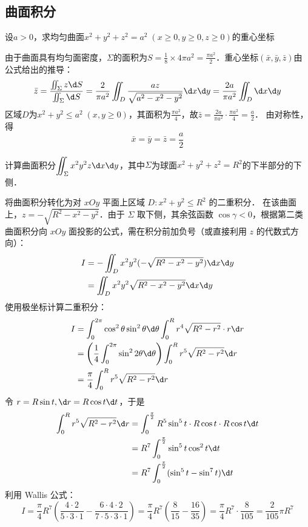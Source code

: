 \documentclass[12pt, a4paper, oneside, UTF8]{ctexbook}
\begin{document}
\subsection{曲面积分}
\begin{exercise}
    设$a>0$，求均匀曲面$x^2+y^2+z^2=a^2\;(x\ge 0,y\ge 0,z\ge 0)$的重心坐标
\end{exercise}
\begin{solution}
    由于曲面具有均匀面密度，$\Sigma$的面积为$S=\frac{1}{8}\times 4\pi a^2 = \frac{\pi a^2}{2}$．重心坐标$(\bar{x},\bar{y},\bar{z})$由公式给出的推导：
    \[\bar{z}=\frac{\iint_\Sigma z\d S}{\iint_\Sigma \d S}=\frac{2}{\pi a^2}\iint_D \frac{az}{\sqrt{a^2-x^2-y^2}}\d x\d y = \frac{2a}{\pi a^2}\iint_D \d x\d y\]
    区域$D$为$x^2+y^2 \le a^2\;(x,y\ge 0)$，其面积为$\frac{\pi a^2}{4}$，故$\bar{z} = \frac{2a}{\pi a^2} \cdot \frac{\pi a^2}{4} = \frac{a}{2}$．
    由对称性，得\[\boxed{\bar{x}=\bar{y}=\bar{z}=\frac{a}{2}}\]
\end{solution}
\begin{exercise}
    计算曲面积分$\displaystyle\iint_\Sigma x^2y^2z \d x\d y$，其中$\Sigma$为球面$x^2+y^2+z^2=R^2$的下半部分的下侧．
\end{exercise}
\begin{solution}
    将曲面积分转化为对 $xOy$ 平面上区域 $D: x^2+y^2 \le R^2$ 的二重积分．
    在该曲面上，$z = -\sqrt{R^2-x^2-y^2}$．由于 $\Sigma$ 取下侧，其余弦函数 $\cos\gamma < 0$，根据第二类曲面积分向 $xOy$ 面投影的公式，需在积分前加负号（或直接利用 $z$ 的代数式方向）：
    \begin{align*}
        I &= -\iint_D x^2 y^2 (-\sqrt{R^2-x^2-y^2}) \d x\d y \\
        &= \iint_D x^2 y^2 \sqrt{R^2-x^2-y^2} \d x\d y
    \end{align*}
    使用极坐标计算二重积分：
    \begin{align*}
        I &= \int_0^{2\pi} \cos^2\theta \sin^2\theta \d \theta \int_0^R r^4 \sqrt{R^2-r^2} \cdot r \d r \\
        &= \left( \frac{1}{4} \int_0^{2\pi} \sin^2 2\theta \d \theta \right) \int_0^R r^5 \sqrt{R^2-r^2} \d r \\
        &= \frac{\pi}{4} \int_0^R r^5 \sqrt{R^2-r^2} \d r
    \end{align*}
    令 $r = R\sin t, \d r = R\cos t \d t$，于是
    \begin{align*}
        \int_0^R r^5 \sqrt{R^2-r^2} \d r &= \int_0^{\frac{\pi}{2}} R^5 \sin^5 t \cdot R\cos t \cdot R\cos t \d t \\
        &= R^7 \int_0^{\frac{\pi}{2}} \sin^5 t \cos^2 t \d t \\
        &= R^7 \int_0^{\frac{\pi}{2}} (\sin^5 t - \sin^7 t) \d t
    \end{align*}
    利用 Wallis 公式：
    \[ I = \frac{\pi}{4} R^7 \left( \frac{4 \cdot 2}{5 \cdot 3 \cdot 1} - \frac{6 \cdot 4 \cdot 2}{7 \cdot 5 \cdot 3 \cdot 1} \right) = \frac{\pi}{4} R^7 \left( \frac{8}{15} - \frac{16}{35} \right) = \frac{\pi}{4} R^7 \cdot \frac{8}{105} = \boxed{\frac{2}{105}\pi R^7} \]
\end{solution}
\end{document}
